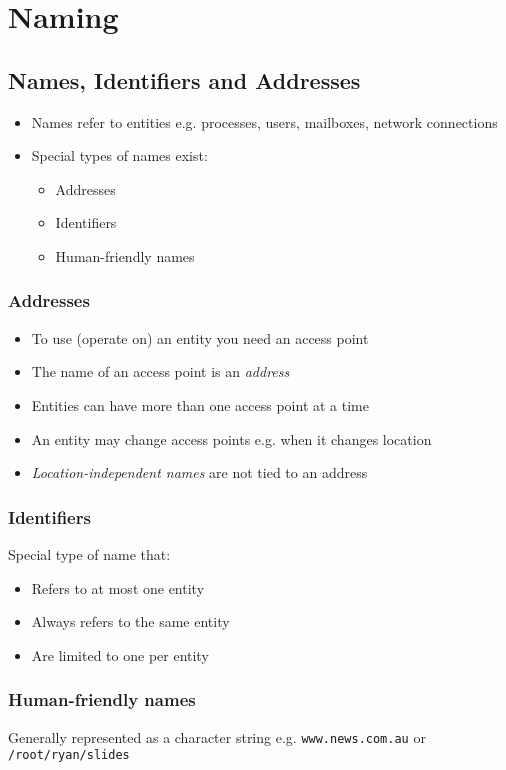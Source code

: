 \section{Naming}
\subsection{Names, Identifiers and Addresses}
\begin{itemize}
	\item Names refer to entities
	\subitem e.g. processes, users, mailboxes, network connections
	\item Special types of names exist:
	\begin{itemize}
		\item Addresses
		\item Identifiers
		\item Human-friendly names
	\end{itemize}
\end{itemize}

\subsubsection{Addresses}
\begin{itemize}
	\item To use (operate on) an entity you need an access point
	\item The name of an access point is an \textit{address}
	\item Entities can have more than one access point at a time
	\item An entity may change access points e.g. when it changes location
	\item \textit{Location-independent names} are not tied to an address
\end{itemize}

\subsubsection{Identifiers}
Special type of name that:
\begin{itemize}
	\item Refers to at most one entity
	\item Always refers to the same entity
	\item Are limited to one per entity
\end{itemize}

\subsubsection{Human-friendly names}
Generally represented as a character string e.g. \texttt{www.news.com.au} or \texttt{/root/ryan/slides}

